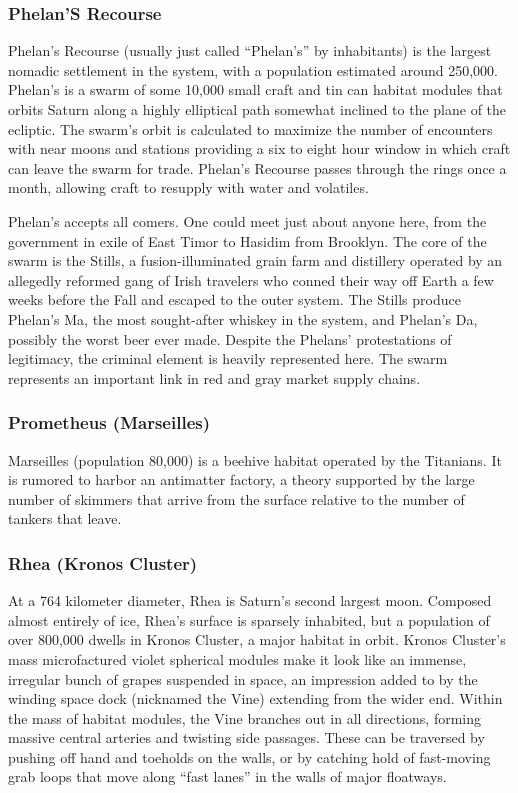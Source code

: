 \subsubsection{Phelan'S Recourse}

Phelan's Recourse (usually just called ``Phelan's'' by 
inhabitants) is the largest nomadic settlement in the 
system, with a population estimated around 250,000. 
Phelan's is a swarm of some 10,000 small craft and tin 
can habitat modules that orbits Saturn along a highly 
elliptical path somewhat inclined to the plane of the 
ecliptic. The swarm's orbit is calculated to maximize 
the number of encounters with near moons and stations
providing a six to eight hour window in which
craft can leave the swarm for trade. Phelan's Recourse 
passes through the rings once a month, allowing craft 
to resupply with water and volatiles.

Phelan's accepts all comers. One could meet just 
about anyone here, from the government in exile of 
East Timor to Hasidim from Brooklyn. The core of 
the swarm is the Stills, a fusion-illuminated grain 
farm and distillery operated by an allegedly reformed 
gang of Irish travelers who conned their way off 
Earth a few weeks before the Fall and escaped to 
the outer system. The Stills produce Phelan's Ma, the 
most sought-after whiskey in the system, and Phelan's 
Da, possibly the worst beer ever made. Despite the 
Phelans' protestations of legitimacy, the criminal 
element is heavily represented here. The swarm 
represents an important link in red and gray market 
supply chains.

\subsubsection{Prometheus (Marseilles)}

Marseilles (population 80,000) is a beehive habitat 
operated by the Titanians. It is rumored to harbor an 
antimatter factory, a theory supported by the large 
number of skimmers that arrive from the surface relative
to the number of tankers that leave.

\subsubsection{Rhea (Kronos Cluster)}

At a 764 kilometer diameter, Rhea is Saturn's second 
largest moon. Composed almost entirely of ice, Rhea's 
surface is sparsely inhabited, but a population of over 
800,000 dwells in Kronos Cluster, a major habitat 
in orbit. Kronos Cluster's mass microfactured violet 
spherical modules make it look like an immense, irregular
bunch of grapes suspended in space, an impression
added to by the winding space dock (nicknamed
the Vine) extending from the wider end. Within the 
mass of habitat modules, the Vine branches out in all 
directions, forming massive central arteries and twisting
side passages. These can be traversed by pushing
off hand and toeholds on the walls, or by catching 
hold of fast-moving grab loops that move along ``fast 
lanes'' in the walls of major floatways.

